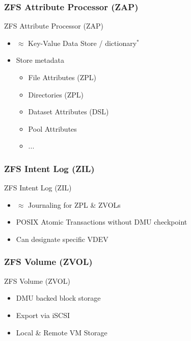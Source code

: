 \subsubsection{ZFS Attribute Processor (ZAP)}
\begin{frame}{ZFS Attribute Processor (ZAP)}
	\begin{itemize}
		\item $\approx$ Key-Value Data Store / dictionary$^*$ %
		\item Store metadata
		\begin{itemize}
			\item File Attributes (ZPL)
			\item Directories (ZPL)
			\item Dataset Attributes (DSL)
			\item Pool Attributes
			\item ...
		\end{itemize}
	\end{itemize}
\end{frame}

\subsubsection{ZFS Intent Log (ZIL)}
\begin{frame}{ZFS Intent Log (ZIL)}
\begin{itemize}
	\item $\approx$ Journaling for ZPL \& ZVOLs
	\item POSIX Atomic Transactions without DMU checkpoint %
	\item Can designate specific VDEV %
\end{itemize}
\end{frame}

\subsubsection{ZFS Volume (ZVOL)}
\begin{frame}{ZFS Volume (ZVOL)}
	\begin{itemize}
		\item DMU backed block storage
		\item Export via iSCSI
		\item Local \& Remote VM Storage %
	\end{itemize}
\end{frame}

